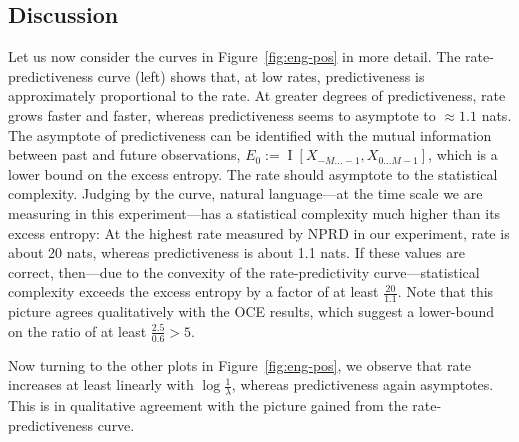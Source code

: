 \documentclass[entropy,article,submit,moreauthors,pdftex,10pt,a4paper]{Definitions/mdpi}
\newif \ifcomment
\newcommand\rljf[1]{\ifcomment{{\color{blue}(#1)}}\else{}\fi}
\begin{document}
\subsection{Discussion}
Let us now consider the curves in Figure~\ref{fig:eng-pos} in more detail.
The rate-predictiveness curve (left) shows that, at low rates, predictiveness is approximately proportional to the rate.
At greater degrees of predictiveness, rate grows faster and faster, whereas predictiveness seems to asymptote to $\approx 1.1$ nats.
The asymptote of predictiveness can be identified with the mutual information between past and future observations, $E_0 := \operatorname{I}[X_{-M\dots -1}, X_{0 \dots M-1}]$, which is a lower bound on the excess entropy. The rate should asymptote to the statistical complexity.
Judging by the curve, natural language---at the time scale we are measuring in this experiment---has a statistical complexity much higher than its excess entropy:
At the highest rate measured by NPRD in our experiment, rate is about 20 nats, whereas predictiveness is about 1.1 nats.
If these values are correct, then---due to the convexity of the rate-predictivity curve---statistical complexity exceeds the excess entropy by a factor of at least $\frac{20}{1.1}$. \rljf{Wow, is this true for any other natural processes?}
Note that this picture agrees qualitatively with the OCE results, which suggest a lower-bound on the ratio of at least $\frac{2.5}{0.6} > 5$.

Now turning to the other plots in Figure~\ref{fig:eng-pos}, we observe that rate increases at least linearly with $\log\frac{1}{\lambda}$, whereas predictiveness again asymptotes.
This is in qualitative agreement with the picture gained from the rate-predictiveness curve.
\end{document}
